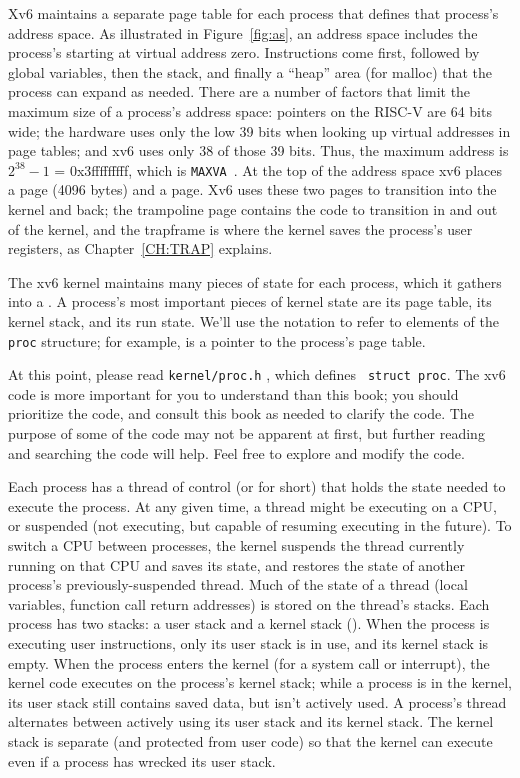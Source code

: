 Xv6 maintains a separate page table for each process that defines that process's
address space. As illustrated in 
Figure~\ref{fig:as},
an address space includes the process's
starting at virtual address zero. Instructions come first,
followed by global variables, then the stack,
and finally a ``heap'' area (for malloc)
that the process can expand as needed.
There are a number of factors that limit the
maximum size of a process's address space:
pointers on the RISC-V are 64 bits wide;
the hardware uses only the low 39 bits when
looking up virtual addresses in page tables;
and xv6 uses only 38 of those 39 bits.
Thus, the maximum address is $2^{38}-1$ =
0x3fffffffff, which is \lstinline{MAXVA}~.
At the top of the address space xv6 places
a  page (4096 bytes)
and a  page.  Xv6 uses these two pages
to transition into the kernel and back;
the trampoline page contains the code to transition in and out
of the kernel, and the trapframe is where the kernel saves
the process's user registers,
as Chapter~\ref{CH:TRAP} explains.

The xv6 kernel maintains many pieces of state for each process,
which it gathers into a
.
A process's most important pieces of kernel state are its 
page table, its kernel stack, and its run state.
We'll use the notation
to refer to elements of the
\lstinline{proc}
structure; for example,
 is a pointer to the process's page table.

At this point, please read \lstinline{kernel/proc.h}
, which defines {\tt
  struct proc}. The xv6 code is more important for you to understand
than this book; you should prioritize the code, and consult this book
as needed to clarify the code. The purpose of some of the code may not
be apparent at first, but further reading and searching the code will
help. Feel free to explore and modify the code.

Each process has a thread of control (or 
for short) that holds the state needed to execute the process.
At any given time, a thread might be executing on a CPU,
or suspended (not executing, but capable of resuming executing
in the future).
To switch a CPU between processes,
the kernel suspends the thread currently running on that CPU
and saves its state,
and restores the state of another process's previously-suspended
thread.  Much of the state of a thread (local variables, function call return
addresses) is stored on the thread's stacks.
Each process has two stacks: a user stack and a kernel stack
().
When the process is executing user instructions, only its user stack
is in use, and its kernel stack is empty.
When the process enters the kernel (for a system call or interrupt),
the kernel code executes on the process's kernel stack; while
a process is in the kernel, its user stack still contains saved
data, but isn't actively used.
A process's thread alternates between actively using its user stack
and its kernel stack. The kernel stack is separate (and protected from
user code) so that the kernel
can execute even if a process has wrecked its user stack.

